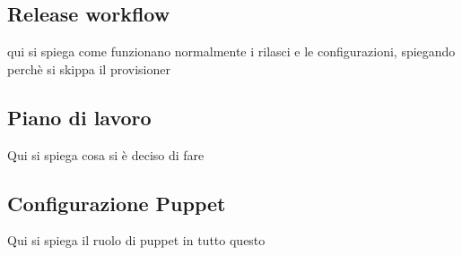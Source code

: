 \subsection{Release workflow}
qui si spiega come funzionano normalmente i rilasci e le configurazioni, spiegando perchè si skippa il provisioner
\subsection{Piano di lavoro}
Qui si spiega cosa si è deciso di fare
\subsection{Configurazione Puppet}
Qui si spiega il ruolo di puppet in tutto questo